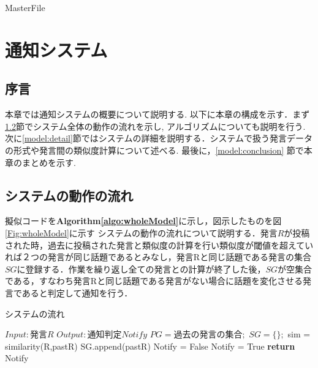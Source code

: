 \expandafter\ifx\csname MasterFile\endcsname\relax
	\def\SubFile{hoge}
  
  
	\setcounter{chapter}{2}
  \fi
  \cleardoublepage
\chapter{通知システム}
%
\label{model:chapter}

\section{序言}
\label{model:introduction}
本章では通知システムの概要について説明する. 以下に本章の構成を示す．まず\ref{model:wholeModel}節でシステム全体の動作の流れを示し, アルゴリズムについても説明を行う. 次に\ref{model:detail}節ではシステムの詳細を説明する．システムで扱う発言データの形式や発言間の類似度計算について述べる. 
最後に，\ref{model:conclusion} 節で本章のまとめを示す.

\section{システムの動作の流れ}
\label{model:wholeModel}
擬似コードを\textbf{Algorithm\ref{algo:wholeModel}}に示し，図示したものを図\ref{Fig:wholeModel}に示す
システムの動作の流れについて説明する．発言$R$が投稿された時，過去に投稿された発言と類似度の計算を行い類似度が閾値を超えていれば２つの発言が同じ話題であるとみなし，発言Rと同じ話題である発言の集合$SG$に登録する．作業を繰り返し全ての発言との計算が終了した後，$SG$が空集合である，すなわち発言Rと同じ話題である発言がない場合に話題を変化させる発言であると判定して通知を行う．
\begin{algorithm}
\caption{システムの流れ} \label{algo:wholeModel}
\begin{algorithmic}[1]
\State $Input:  発言R$
\State $Output: 通知判定Notify$
\State $PG = 過去の発言の集合;$%
	\State $SG = \{\};$%
	 \label{algo:wholeModel:for1-b}
	 	\State sim = similarity(R,pastR)
			\State SG.append(pastR)
		\EndIf
	 \EndFor\label{algo:wholeModel:for1-e}
	 \State Notify = False
		\State Notify = True
	\EndIf
	\State \textbf{return} Notify
\EndProcedure
\end{algorithmic}
\end{algorithm}

